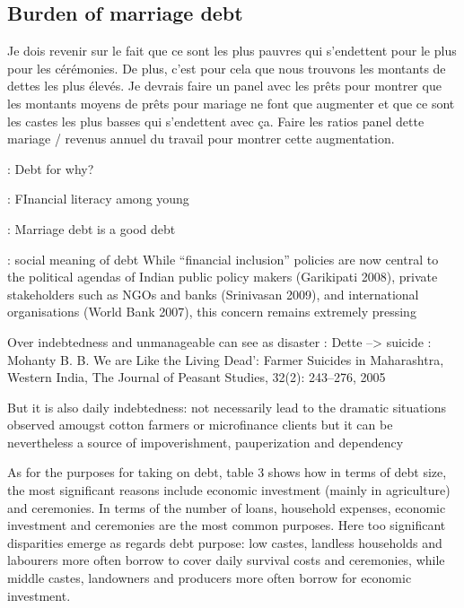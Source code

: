 \documentclass[a4paper, 11pt, onecolumn]{article}
\begin{document}
\subsection{Burden of marriage debt}

Je dois revenir sur le fait que ce sont les plus pauvres qui s'endettent pour le plus pour les cérémonies. De plus, c'est pour cela que nous trouvons les montants de dettes les plus élevés.
Je devrais faire un panel avec les prêts pour montrer que les montants moyens de prêts pour mariage ne font que augmenter et que ce sont les castes les plus basses qui s'endettent avec ça.
Faire les ratios panel dette mariage / revenus annuel du travail pour montrer cette augmentation.


\cite{Guerin2011, Reboul2019} : Debt for why?

\cite{Agarwalla2015} : FInancial literacy among young

\citep{Carswell2021} : Marriage debt is a good debt

\cite{Guerin2014a} : social meaning of debt
While “financial inclusion” policies are now central to the political agendas of Indian public
policy makers (Garikipati 2008), private stakeholders such as NGOs and banks (Srinivasan
2009), and international organisations (World Bank 2007), this concern remains extremely
pressing

Over indebtedness and unmanageable can see as disaster : 
Dette --> suicide : Mohanty B. B. We are Like the Living Dead’: Farmer Suicides in Maharashtra, Western India, The Journal
of Peasant Studies, 32(2): 243–276, 2005

But it is also daily indebtedness: not necessarily lead to the dramatic situations observed amougst cotton farmers or microfinance clients but it can be nevertheless a source of impoverishment, pauperization and dependency \citep{Guerin2014a}

As for
the purposes for taking on debt, table 3 shows how in terms of debt size, the most significant
reasons include economic investment (mainly in agriculture) and ceremonies. In terms of the
number of loans, household expenses, economic investment and ceremonies are the most
common purposes. Here too significant disparities emerge as regards debt purpose: low castes, landless households and labourers more often borrow to cover daily survival costs and
ceremonies, while middle castes, landowners and producers more often borrow for economic
investment.
\end{document}

